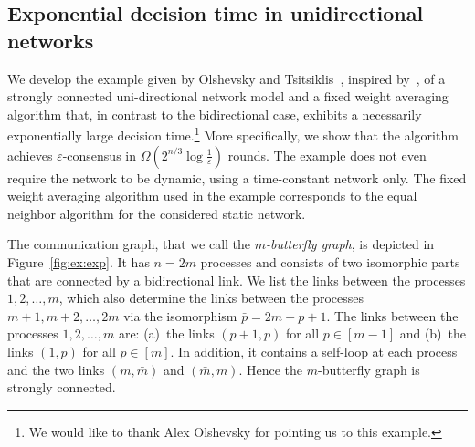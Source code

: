 \documentclass[a4paper]{article}
\theoremstyle{newthm}
\begin{document}
\subsection{Exponential decision time in unidirectional networks}

We develop the example given by Olshevsky and Tsitsiklis~\cite{OT11v1},
        inspired by~\cite{Chu97},
        of a strongly connected uni-directional network model and a fixed weight
	averaging algorithm that, in contrast to the bidirectional case, exhibits a
	necessarily exponentially large decision time.\footnote{We would like to thank Alex Olshevsky for
        pointing us to this example.}
More specifically, we show that the algorithm achieves $\varepsilon$-consensus in
	$\Omega(2^{n/3}\log\frac{1}{\varepsilon})$ rounds.
The example does not even require the network to be dynamic, using a time-constant network
        only.
The fixed weight averaging algorithm used in the example corresponds to the equal neighbor algorithm
        for the considered static network.

The communication graph, that we call the {\em $m$-butterfly graph}, is depicted 
	in Figure~\ref{fig:ex:exp}.
It has $n = 2m$ processes and consists of two isomorphic parts that are connected
	by a bidirectional link.
We  list the links between the processes $1,2,\dots,m$, which also determine
	the links between the processes $m+1,m+2,\dots,2m$ via the isomorphism 
	$\bar{p} = 2m - p + 1$.
The links between the processes $1,2,\dots,m$ are: (a)~the links $(p+1,p)$ for all
	$p \in [m-1] $ and (b)~the links $(1,p)$ for all $p\in[m]$.
In addition, it contains a self-loop at each process and the two 
	 links $(m,\bar{m})$ and $(\bar{m},m)$. 
Hence the $m$-butterfly graph is strongly connected.
	 
\end{document}
